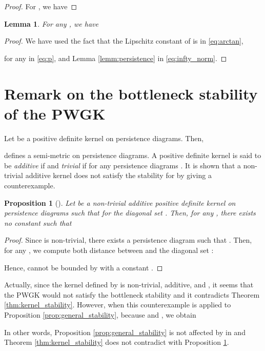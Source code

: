 \documentclass{article}
\newtheorem{lem}[thm]{Lemma}
\newtheorem{prop}[thm]{Proposition}
\begin{document}
\begin{proof}
For , we have

\end{proof}

\begin{lem}
\label{lemm:w_continuous}
For any , we have 

\end{lem}

\begin{proof}

We have used the fact that the Lipschitz constant of  is  in \eqref{eq:arctan},

for any  in \eqref{eq:p}, and Lemma \ref{lemm:persistence} in \eqref{eq:infty_norm}.
\end{proof}

\section{Remark on the bottleneck stability of the PWGK}
\label{sec:additive}
Let  be a positive definite kernel on persistence diagrams.
Then, 

defines a semi-metric on persistence diagrams.
A positive definite kernel  is said to be {\em additive} if  and {\em trivial} if  for any persistence diagrams . 
It is shown that a non-trivial additive kernel does not satisfy the  stability for  by giving a counterexample.

\begin{prop}[\cite{RHBK15}]
\label{prop:additive}
Let  be a non-trivial additive positive definite kernel  on persistence diagrams such that  for the diagonal set .
Then, for any , there exists no constant  such that

\end{prop}

\begin{proof}
Since  is non-trivial, there exists a persistence diagram  such that .
Then, for any , we compute both distance between  and the diagonal set :

Hence,  cannot be bounded by  with a constant .
\end{proof}

Actually, since the kernel  defined by  is non-trivial, additive, and , it seems that the PWGK would not satisfy the bottleneck stability and it contradicts Theorem \ref{thm:kernel_stability}.
However, when this counterexample is applied to Proposition \ref{prop:general_stability}, 
because  and , we obtain

In other words, Proposition \ref{prop:general_stability} is not affected by  in  and Theorem \ref{thm:kernel_stability} does not contradict with Proposition \ref{prop:additive}.

\newpage



\end{document}
